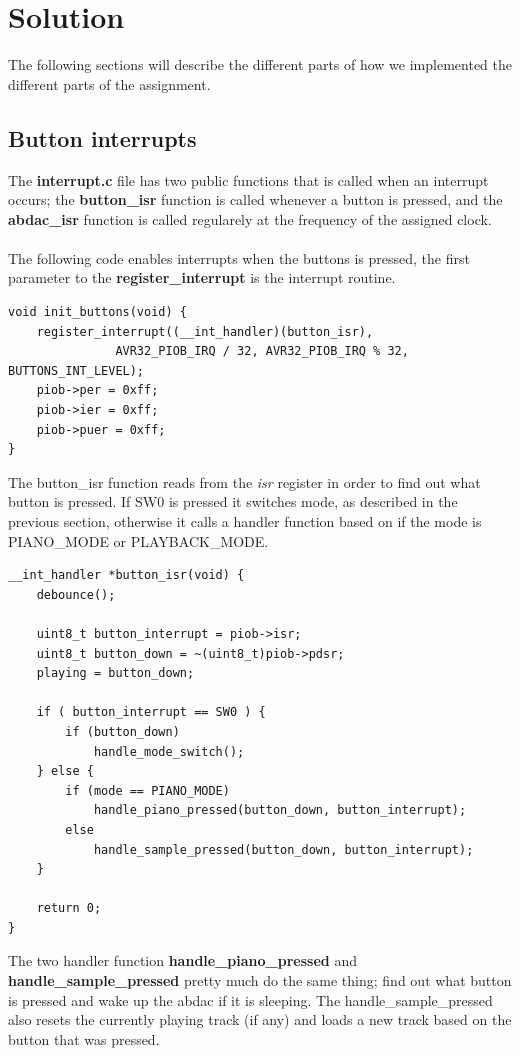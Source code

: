 \section{Solution}
The following sections will describe the different parts of how we implemented the
different parts of the assignment.
\subsection{Button interrupts}
The \textbf{interrupt.c} file has two public functions that is called when an interrupt occurs;
the \textbf{button\_isr} function is called whenever a button is pressed, and
the \textbf{abdac\_isr} function is called regularely at the frequency of the assigned clock.\\
\\
The following code enables interrupts when the buttons is pressed, the first parameter to
the \textbf{register\_interrupt} is the interrupt routine. \\
\begin{lstlisting}
void init_buttons(void) {
	register_interrupt((__int_handler)(button_isr),
			   AVR32_PIOB_IRQ / 32, AVR32_PIOB_IRQ % 32, BUTTONS_INT_LEVEL);
	piob->per = 0xff;
	piob->ier = 0xff;
	piob->puer = 0xff;
}
\end{lstlisting}
The button\_isr function reads from the \textit{isr} register in order to find out what button
is pressed. If SW0 is pressed it switches mode, as described in the previous section,
otherwise it calls a handler function based on if the mode is PIANO\_MODE or PLAYBACK\_MODE.
\begin{lstlisting}
__int_handler *button_isr(void) {
	debounce();

	uint8_t button_interrupt = piob->isr;
	uint8_t button_down = ~(uint8_t)piob->pdsr;
	playing = button_down;

	if ( button_interrupt == SW0 ) {
		if (button_down)
			handle_mode_switch();
	} else {
		if (mode == PIANO_MODE)
			handle_piano_pressed(button_down, button_interrupt);
		else
			handle_sample_pressed(button_down, button_interrupt);
	}

	return 0;
}
\end{lstlisting}
The two handler function \textbf{handle\_piano\_pressed} and \textbf{handle\_sample\_pressed}
pretty much do the same thing; find out what button is pressed and
wake up the abdac if it is sleeping. The handle\_sample\_pressed also resets the currently
playing track (if any) and loads a new track based on the button that was pressed.

